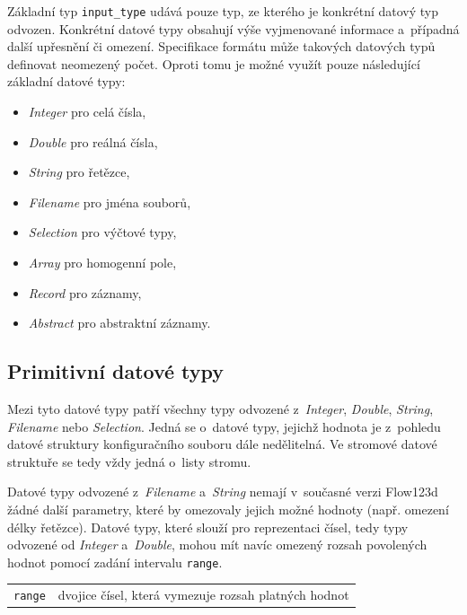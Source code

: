 \documentclass[FM,bw,DP]{tulthesis}
\begin{document}
Základní typ \texttt{input\_type} udává pouze typ, ze kterého je konkrétní datový typ odvozen. Konkrétní datové typy obsahují výše vyjmenované informace a~případná další upřesnění či omezení. Specifikace formátu může takových datových typů definovat neomezený počet. Oproti tomu je možné využít pouze následující základní datové typy:

\begin{itemize}[itemsep=2pt, topsep=12pt, partopsep=0pt]
\item \textit{Integer} pro celá čísla,
\item \textit{Double} pro reálná čísla,
\item \textit{String} pro řetězce,
\item \textit{Filename} pro jména souborů,
\item \textit{Selection} pro výčtové typy,
\item \textit{Array} pro homogenní pole,
\item \textit{Record} pro záznamy,
\item \textit{Abstract} pro abstraktní záznamy.
\end{itemize}

\subsection{Primitivní datové typy}

Mezi tyto datové typy patří všechny typy odvozené z~\textit{Integer}, \textit{Double}, \textit{String}, \textit{Filename} nebo \textit{Selection}. Jedná se o~datové typy, jejichž hodnota je z~pohledu datové struktury konfiguračního souboru dále nedělitelná. Ve stromové datové struktuře se tedy vždy jedná o~listy stromu.

Datové typy odvozené z~\textit{Filename} a~\textit{String} nemají v~současné verzi Flow123d žádné další parametry, které by omezovaly jejich možné hodnoty (např. omezení délky řetězce). Datové typy, které slouží pro reprezentaci čísel, tedy typy odvozené od \textit{Integer} a~\textit{Double}, mohou mít navíc omezený rozsah povolených hodnot pomocí zadání intervalu \texttt{range}.

\vspace{0.5cm}
\begin{tabular}{m{3cm}@{}l}
\texttt{range}\dotfill & dvojice čísel, která vymezuje rozsah platných hodnot \\
\end{tabular}
\vspace{0.5cm}
\end{document}
